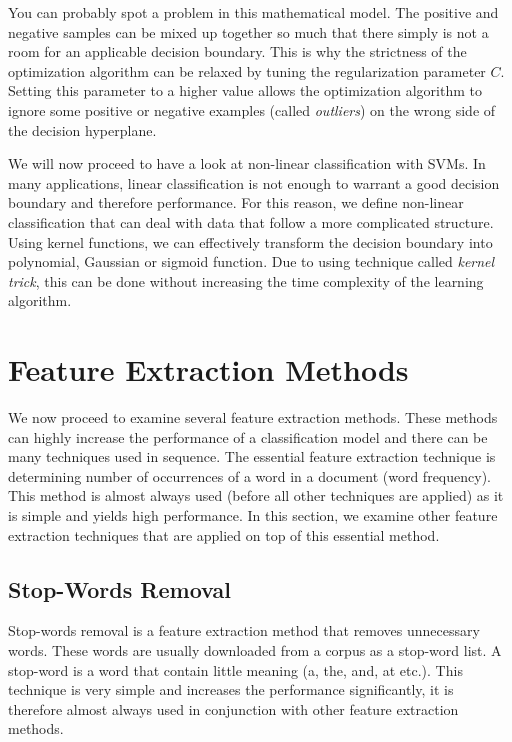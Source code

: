 You can probably spot a problem in this mathematical model. The positive and negative samples can be mixed up together so much that there simply is not a room for an applicable decision boundary. This is why the strictness of the optimization algorithm can be relaxed by tuning the regularization parameter $C$. Setting this parameter to a higher value allows the optimization algorithm to ignore some positive or negative examples (called \textit{outliers}) on the wrong side of the decision hyperplane.

We will now proceed to have a look at non-linear classification with SVMs. In many applications, linear classification is not enough to warrant a good decision boundary and therefore performance. For this reason, we define non-linear classification that can deal with data that follow a more complicated structure. Using kernel functions, we can effectively transform the decision boundary into polynomial, Gaussian or sigmoid function. Due to using technique called \textit{kernel trick}, this can be done without increasing the time complexity of the learning algorithm.

\section{Feature Extraction Methods}

We now proceed to examine several feature extraction methods. These methods can highly increase the performance of a classification model and there can be many techniques used in sequence. The essential feature extraction technique is determining number of occurrences of a word in a document (word frequency). This method is almost always used (before all other techniques are applied) as it is simple and yields high performance. In this section, we examine other feature extraction techniques that are applied on top of this essential method.

\subsection{Stop-Words Removal}

Stop-words removal is a feature extraction method that removes unnecessary words. These words are usually downloaded from a corpus as a stop-word list. A stop-word is a word that contain little meaning (a, the, and, at etc.). This technique is very simple and increases the performance significantly, it is therefore almost always used in conjunction with other feature extraction methods. 

